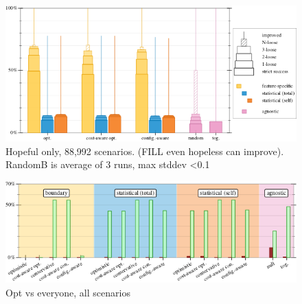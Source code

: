 \begin{figure}[t]
  \includegraphics[width=0.8\columnwidth]{data/strategy-overall-hope.pdf}
  \caption{Hopeful only, 88,992 scenarios. (FILL even hopeless can improve). RandomB is average of 3 runs, max stddev <0.1}
  \label{f:strategy-hope}
\end{figure}

\begin{figure}[t]
  \includegraphics[width=\columnwidth]{data/head-to-head.pdf}
  \caption{Opt vs everyone, all scenarios}
  \label{f:head-to-head}
\end{figure}

\clearpage

